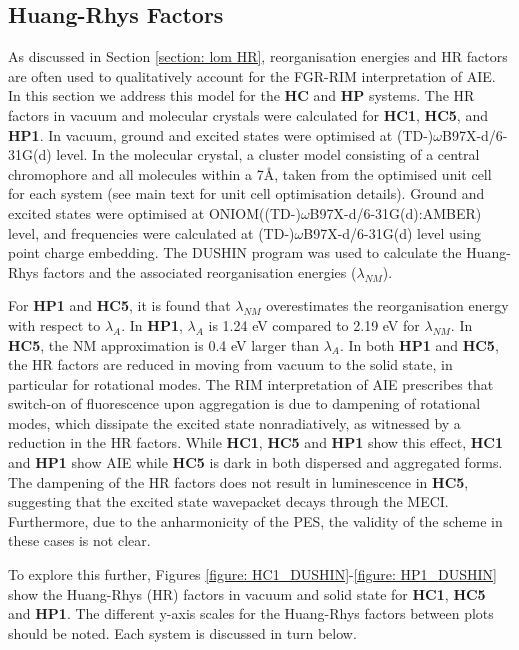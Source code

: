 \subsection{Huang-Rhys Factors}\label{section: HR}
As discussed in Section \ref{section: lom HR}, reorganisation energies and \acf{HR} factors are often used to qualitatively account for the \ac{FGR-RIM} interpretation of \ac{AIE}. In this section we address this model for the \textbf{HC} and \textbf{HP} systems.  The \ac{HR} factors in vacuum and molecular crystals were calculated for \textbf{HC1}, \textbf{HC5}, and \textbf{HP1}. In vacuum, ground and excited states were optimised at (TD-)$\omega$B97X-d/6-31G(d) level. In the molecular crystal, a cluster model consisting of a central chromophore and all molecules within a 7\AA{}, taken from the optimised unit cell for each system (see main text for unit cell optimisation details). Ground and excited states were optimised at ONIOM((TD-)$\omega$B97X-d/6-31G(d):AMBER) level, and frequencies were calculated at (TD-)$\omega$B97X-d/6-31G(d) level using point charge embedding. The DUSHIN program was used to calculate the Huang-Rhys factors and the associated reorganisation energies ($\lambda_{NM}$).\cite{Reimers2001}

For \textbf{HP1} and \textbf{HC5}, it is found that $\lambda_{NM}$ overestimates the reorganisation energy with respect to $\lambda_{A}$. In \textbf{HP1},  $\lambda_{A}$ is 1.24 eV compared to 2.19 eV for $\lambda_{NM}$. In \textbf{HC5}, the NM approximation is 0.4 eV larger than $\lambda_{A}$. In both \textbf{HP1} and \textbf{HC5}, the HR factors are reduced in moving from vacuum to the solid state, in particular for rotational modes. The RIM interpretation of AIE prescribes that switch-on of fluorescence upon aggregation is due to dampening of rotational modes, which dissipate the excited state nonradiatively, as witnessed by a reduction in the HR factors. While \textbf{HC1}, \textbf{HC5} and \textbf{HP1} show this effect, \textbf{HC1} and \textbf{HP1} show AIE while \textbf{HC5} is dark in both dispersed and aggregated forms. The dampening of the HR factors does not result in luminescence in \textbf{HC5}, suggesting that the excited state wavepacket decays through the MECI.\cite{Dommett2017} Furthermore, due to the anharmonicity of the PES, the validity of the scheme in these cases is not clear.

To explore this further, Figures \ref{figure: HC1_DUSHIN}-\ref{figure: HP1_DUSHIN} show the Huang-Rhys (HR) factors in vacuum and solid state for \textbf{HC1}, \textbf{HC5} and \textbf{HP1}. The different y-axis scales for the Huang-Rhys factors between plots should be noted. Each system is discussed in turn below.

